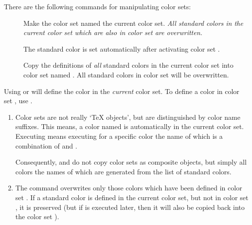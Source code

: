 \documentclass[12pt]{scrartcl}
\let\newslide=\relax
\begin{document}
  \newslide

  There are the following commands for manipulating color sets:
  \begin{description}
  \item[]
    Make the color set named  the current color set.
    \emph{All standard colors in the current color set which are also in color set  are overwritten.}

    The standard color  is set automatically after activating color set .

  \item[]
    Copy the definitions of \emph{all} standard colors in the
    current color set into color set named . All standard colors in color set  will be
    overwritten.
  \end{description}

  \newslide

  Using  or  will define the color
   in the \emph{current} color set. To define a color in color set , use
  .

    \newslide

  \begin{enumerate}
  \item Color sets are not really `\TeX{} objects', but are distinguished by color name suffixes. This means, a color
    named  is automatically in the current color set. Executing 
    means executing  for a specific color the name of which is a combination of  and
    .

    Consequently,  and  do not copy color sets as composite objects, but
    simply all colors the names of which are generated from the list of standard colors.

    \newslide

  \item The command  overwrites only those colors which have been defined in color
    set . If a standard color is defined in the current color set, but not in color set , it is
    preserved (but if  is executed later, then it will also be copied back into
    the color set ).
  \end{enumerate}
\end{document}
